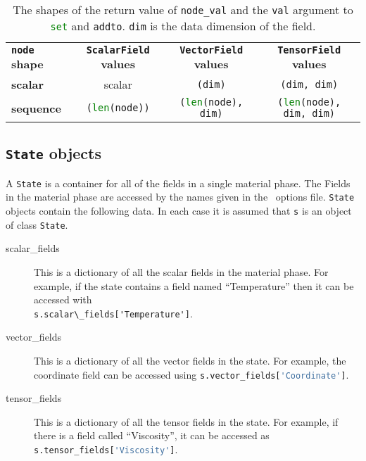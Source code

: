 \begin{table}
\centering

\begin{tabular}{lccc}
  \textbf{\lstinline[language=Python]+node+ shape}
  &\textbf{\lstinline[language=Python]+ScalarField+ values} & 
  \textbf{\lstinline[language=Python]+VectorField+ values} & 
  \textbf{\lstinline[language=Python]+TensorField+ values}\\
  \textbf{scalar} &
scalar& \lstinline[language=Python]+(dim)+ &\lstinline[language=Python]+(dim, dim)+ \\
  \textbf{sequence} &
\lstinline[language=Python]+(len(node))+&
\lstinline[language=Python]+(len(node), dim)+&
\lstinline[language=Python]+(len(node), dim, dim)+\\
\end{tabular}

\caption{The shapes of the return value of \lstinline[language=Python]+node_val+ and the
\lstinline[language=Python]+val+ argument to
\lstinline[language=Python]+set+ and
\lstinline[language=Python]+addto+. \lstinline[language=Python]+dim+ is the
data dimension of the field.
}
\end{table}

\subsection{\lstinline[language=Python]+State+ objects}

A \lstinline[language=Python]+State+ is a container for all of the fields in
a single material phase. The Fields in the material phase are accessed by
the names given in the \fluidity\ options file.
\lstinline[language=Python]+State+ objects contain the following data. In
each case it is assumed that \lstinline[language=Python]+s+ is an object of
class \lstinline[language=Python]+State+.

\begin{description}
\item[scalar\_fields] This is a dictionary of all the scalar fields in the
  material phase. For example, if the state contains a field named
  ``Temperature'' then it can be accessed with\\
  \lstinline+s.scalar\_fields['Temperature']+.
\item[vector\_fields] This is a dictionary of all the vector fields in the
  state. For example, the coordinate field can be accessed using
  \lstinline[language=Python]+s.vector_fields['Coordinate']+.
\item[tensor\_fields] This is a dictionary of all the tensor fields in the
  state. For example, if there is a field called ``Viscosity'', it can be
  accessed as \lstinline[language=Python]+s.tensor_fields['Viscosity']+.
\end{description}

